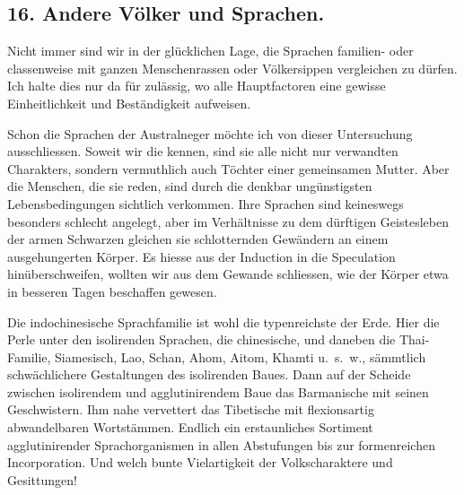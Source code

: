 \subsection*{16. Andere Völker und Sprachen.}\label{IV.IV.16}

Nicht immer sind wir in der glücklichen Lage, die Sprachen familien- oder classenweise mit ganzen Menschenrassen oder Völkersippen vergleichen zu dürfen. Ich halte dies nur da für zulässig, wo alle Hauptfactoren eine gewisse Einheitlichkeit und Beständigkeit aufweisen.

\label{fp.404}

Schon die Sprachen der Australneger möchte ich von dieser Untersuchung ausschliessen. Soweit wir die kennen, sind sie alle nicht nur verwandten Charakters, sondern vermuthlich auch Töchter einer gemeinsamen Mutter. Aber die Menschen, die sie reden, sind durch die denkbar ungünstigsten Lebensbedingungen sichtlich verkommen. Ihre Sprachen sind keineswegs besonders schlecht angelegt, aber im Verhältnisse zu dem dürftigen Geistesleben der armen Schwarzen gleichen sie schlotternden Gewändern an einem ausgehungerten Körper. Es hiesse aus der Induction in die Speculation hinüberschweifen, \label{sp.426} wollten wir aus dem Gewande schliessen, wie der Körper etwa in besseren Tagen beschaffen gewesen.

\begin{sloppypar}Die indochinesische Sprachfamilie ist wohl die typenreichste der Erde. Hier die Perle unter den isolirenden Sprachen, die chinesische, und daneben die Thai-Familie, Siamesisch, Lao, Schan, Ahom, Aitom, Khamti u.~s.~w., sämmtlich schwächlichere Gestaltungen des isolirenden Baues. Dann auf der Scheide zwischen isolirendem und agglutinirendem Baue das Barmanische mit seinen Geschwistern. Ihm nahe vervettert das Tibetische mit flexionsartig abwandelbaren Wortstämmen. Endlich ein erstaunliches Sortiment agglutinirender Sprachorganismen in allen Abstufungen bis zur formenreichen Incorporation. Und welch bunte Vielartigkeit der Volkscharaktere und Gesittungen!\end{sloppypar}
\largerpage[-1]

